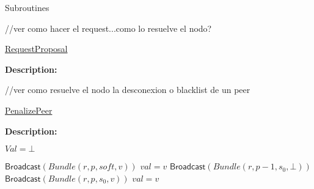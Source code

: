 \documentclass[10pt,a4paper]{article}
\begin{document}
\begin{section}{Subroutines}

\begin{algorithm}[H]\label{algo:request-proposal}
    \begin{algorithmic}[1]
        //ver como hacer el request...como lo resuelve el nodo?
    \EndFunction
    \end{algorithmic}
    \caption{\underline{RequestProposal}}
\end{algorithm}

\noindent \textbf{Description:}\\


\begin{algorithm}[H]\label{algo:penalize-peer}
    \begin{algorithmic}[1]
        //ver como resuelve el nodo la desconexion o blacklist de un peer
    \EndFunction
    \end{algorithmic}
    \caption{\underline{PenalizePeer}}
\end{algorithm}

\noindent \textbf{Description:}\\


\begin{algorithm}[H]\label{algo:resynchronization-attempt}
    \begin{algorithmic}[1]


    \State $Val = \bot$

        \State $\mathsf{Broadcast}(Bundle(r, p, soft, v))$
        \State $val = v$    
        \State $\mathsf{Broadcast}(Bundle(r, p - 1, s_0, \bot))$
        \State $\mathsf{Broadcast}(Bundle(r, p, s_0, v))$
        \State $val = v$
    \EndIf


\end{algorithmic}
\end{algorithm}
\end{section}
\end{document}
